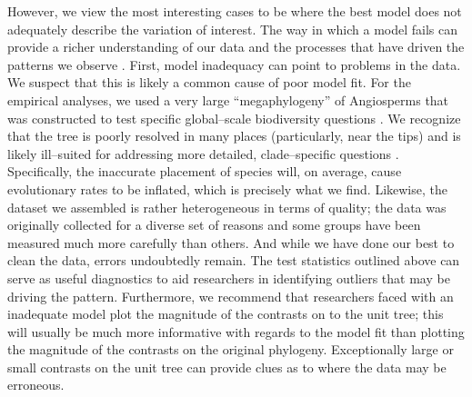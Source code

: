 \documentclass[a4paper,11pt]{article}
\begin{document}
However, we view the most interesting cases to be where the best model does not adequately describe the variation of interest. The way in which a model fails can provide a richer understanding of our data and the processes that have driven the patterns we observe \citep{Gelman2012}. First, model inadequacy can point to problems in the data. We suspect that this is likely a common cause of poor model fit. For the empirical analyses, we used a very large ``megaphylogeny'' of Angiosperms that was constructed to test specific global--scale biodiversity questions \citep{Zanne2013}. We recognize that the tree is poorly resolved in many places (particularly, near the tips) and is likely ill--suited for addressing more detailed, clade--specific questions \citep[see the recent critique by][]{DonoghueEdwards}. Specifically, the inaccurate placement of species will, on average, cause evolutionary rates to be inflated, which is precisely what we find. Likewise, the dataset we assembled is rather heterogeneous in terms of quality; the data was originally collected for a diverse set of reasons and some groups have been measured much more carefully than others. And while we have done our best to clean the data, errors undoubtedly remain. The test statistics outlined above can serve as useful diagnostics to aid researchers in identifying outliers that may be driving the pattern. Furthermore, we recommend that researchers faced with an inadequate model plot the magnitude of the contrasts on to the unit tree; this will usually be much more informative with regards to the model fit than plotting the magnitude of the contrasts on the original phylogeny. Exceptionally large or small contrasts on the unit tree can provide clues as to where the data may be erroneous.
\end{document}
